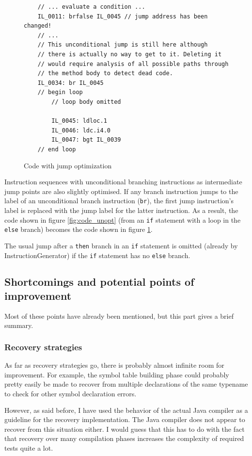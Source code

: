 \documentclass[a4paper,11pt]{article}
\begin{document}
\begin{figure}[h!]
\caption{Code with jump optimization} \label{fig:code_opt}
\begin{verbatim}
    // ... evaluate a condition ...
    IL_0011: brfalse IL_0045 // jump address has been changed!
    // ...
    // This unconditional jump is still here although
    // there is actually no way to get to it. Deleting it
    // would require analysis of all possible paths through
    // the method body to detect dead code.
    IL_0034: br IL_0045
    // begin loop
        // loop body omitted

        IL_0045: ldloc.1
        IL_0046: ldc.i4.0
        IL_0047: bgt IL_0039
    // end loop
\end{verbatim}
\end{figure}

Instruction sequences with unconditional branching instructions as intermediate jump points are also slightly optimised. If any branch instruction jumps to the label of an unconditional branch instruction (\verb,br,), the first jump instruction's label is replaced with the jump label for the latter instruction. As a result, the code shown in figure \ref{fig:code_unopt} (from an \verb,if, statement with a loop in the \verb,else, branch) becomes the code shown in figure \ref{fig:code_opt}.

The usual jump after a \verb,then, branch in an \verb,if, statement is omitted (already by InstructionGenerator) if the \verb,if, statement has no \verb,else, branch.

\subsection{Shortcomings and potential points of improvement}

Most of these points have already been mentioned, but this part gives a brief summary.

\subsubsection{Recovery strategies}

As far as recovery strategies go, there is probably almost infinite room for improvement. For example, the symbol table building phase could probably pretty easily be made to recover from multiple declarations of the same typename to check for other symbol declaration errors.

However, as said before, I have used the behavior of the actual Java compiler as a guideline for the recovery implementation. The Java compiler does not appear to recover from this situation either. I would guess that this has to do with the fact that recovery over many compilation phases increases the complexity of required tests quite a lot.
\end{document}
